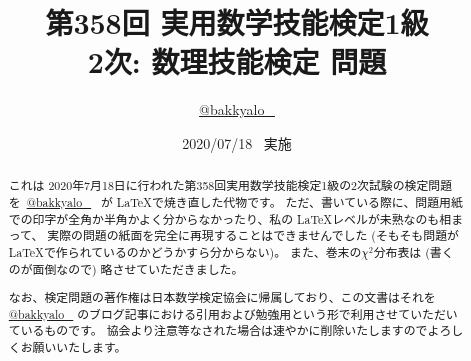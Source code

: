 \documentclass[dvipdfmx, 11pt]{jsarticle}
\title{第358回 実用数学技能検定1級 \\ 2次: 数理技能検定  問題}
\author{\href{https://twitter.com/bakkyalo_}{@bakkyalo\_}}
\date{2020/07/18 \ 実施}
\renewcommand{\(}[0]{\left(}
\renewcommand{\)}[0]{\right)}
\renewcommand{\[}[0]{\left[}
\renewcommand{\]}[0]{\right]}
\begin{document}
\maketitle

\begin{abstract}
	これは 2020年7月18日に行われた第358回実用数学技能検定1級の2次試験の検定問題を\,
	\href{https://twitter.com/bakkyalo_}{@bakkyalo\_} \, が \LaTeX で焼き直した代物です。
	ただ、書いている際に、問題用紙での印字が全角か半角かよく分からなかったり、私の \LaTeX レベルが未熟なのも相まって、
	実際の問題の紙面を完全に再現することはできませんでした (そもそも問題が \LaTeX で作られているのかどうかすら分からない)。
	また、巻末の$\chi^2$分布表は (書くのが面倒なので) 略させていただきました。
	
	なお、検定問題の著作権は日本数学検定協会に帰属しており、この文書はそれを \href{https://twitter.com/bakkyalo_}{@bakkyalo\_} のブログ記事における引用および勉強用という形で利用させていただいているものです。
	協会より注意等なされた場合は速やかに削除いたしますのでよろしくお願いいたします。
\end{abstract}

\newpage \ \thispagestyle{empty}
\newpage
\end{document}
